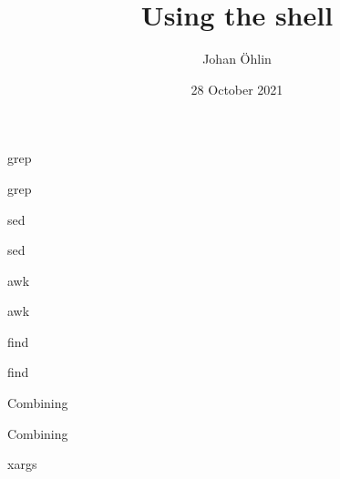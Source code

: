\documentclass{beamer}
\title{Using the shell}
\date{28 October 2021}
\author{Johan Öhlin}
\institute{Yabs}
\begin{document}
\maketitle

\begin{frame}{grep}
\end{frame}

\begin{frame}{grep}
\end{frame}

\begin{frame}{sed}
\end{frame}

\begin{frame}{sed}
\end{frame}

\begin{frame}{awk}
\end{frame}

\begin{frame}{awk}
\end{frame}

\begin{frame}{find}
\end{frame}

\begin{frame}{find}
\end{frame}

\begin{frame}{Combining}
\end{frame}

\begin{frame}{Combining}
\end{frame}

\begin{frame}{xargs}
\end{frame}
\end{document}
